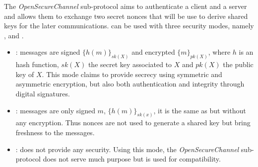 \newcommand{\gereq}{GEReq}
\newcommand{\geres}{GERes}
\newcommand{\oscreq}{OSCReq}
\newcommand{\oscres}{OSCRes}


The {\em OpenSecureChannel} sub-protocol  aims to authenticate a client and
a server and allows them to exchange two secret nonces that will be use to derive
shared keys for the later communications.
\opcua{} can be used with three security modes, namely {\em \smn}, {\em \sms} and
{\em \smse}.
\vspace{-.5em}
\begin{itemize}
    \item {\em \smse}: messages are signed $\{h(m)\}_{sk(X)}$ and
      encrypted $\{m\}_{pk(X)}$, where $h$ is an hash function, $sk(X)$ the
      secret key associated to $X$ and $pk(X)$ the public key of $X$.
      This mode claims to provide secrecy
      using symmetric and asymmetric encryption, but also both
      authentication and integrity through digital signatures.
  \item {\em \sms}: messages are only signed $m$, $\{h(m)\}_{sk(x)}$,
    it is the same as {\em \smse} but without any encryption.  Thus
    nonces are not used to generate a shared key but bring freshness
    to the messages.
  \item {\em \smn}: does not provide any security.  Using this mode, the
      {\em OpenSecureChannel} sub-protocol does not serve much
      purpose but is used for compatibility.
\end{itemize}

